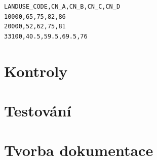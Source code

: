 \documentclass[a4paper,oneside,12pt]{book}
\begin{document}
\begin{lstlisting}[style=mypython, caption={Ukázka CN\_table.csv},label={kod:CN_table.csv}]
LANDUSE_CODE,CN_A,CN_B,CN_C,CN_D
10000,65,75,82,86
20000,52,62,75,81
33100,40.5,59.5,69.5,76
\end{lstlisting}


\section{Kontroly} \label{checks}
\section{Testování} \label{testing}
\section{Tvorba dokumentace} \label{docs}

\clearpage  %
  \label{zdroje}
\end{document}
